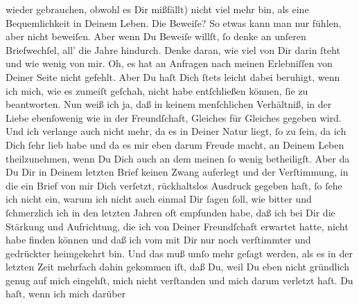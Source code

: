 \begin{ledgroupsized}[t]{13cm}
               wieder gebrauchen,  obwohl es Dir mißfällt) nicht viel mehr bin, als eine Bequemlichkeit in Deinem
               Leben. Die Beweiſe? So etwas kann man nur fühlen, aber nicht beweiſen. Aber wenn Du
               Beweiſe willſt, ſo denke an unſeren Briefwechſel, all’ die Jahre hindurch. Denke {\pb}daran, wie viel von Dir darin ſteht und wie wenig
               von mir. Oh, es hat an Anfragen nach meinen Erlebniſſen von Deiner Seite nicht
               gefehlt. Aber Du haſt Dich ſtets leicht dabei beruhigt, wenn ich mich, wie es zumeiſt
               geſchah, nicht habe entſchließen können, ſie zu beantworten. Nun weiß ich ja, daß in
               keinem menſchlichen Verhältniß, in der Liebe ebenſowenig wie in der Freundſchaft,
               Gleiches für Gleiches gegeben wird. Und ich verlange auch nicht mehr, da es in Deiner
               Natur liegt, ſo zu ſein, da ich Dich ſehr lieb habe und da es mir eben darum Freude
               macht, an Deinem Leben theilzunehmen, wenn Du Dich auch an dem meinen ſo wenig
               betheiligſt. Aber da Du Dir in Deinem letzten Brief keinen Zwang auferlegt und der
               Verſtimmung, in die ein Brief von mir Dich verſetzt, rückhaltslos Ausdruck gegeben
               haſt, ſo ſehe ich nicht ein, warum ich nicht auch einmal Dir ſagen ſoll, wie bitter
               und ſchmerzlich \strikeout{\textcolor{gray}{h}} ich in den letzten Jahren oft  empfunden
               habe, daß {\pb}ich bei Dir die Stärkung und Aufrichtung,
               die ich von Deiner Freundſchaft erwartet hatte, nicht habe finden können und daß ich
               vom \label{K_L03194-2v}\label{K_L03194-2h} mit Dir nur noch verſtimmter und gedrückter heimgekehrt bin. Und das muß umſo
               mehr geſagt werden, als es in der letzten Zeit mehrfach dahin gekommen iſt, daß Du,
               weil Du eben nicht gründlich genug auf mich eingehſt, mich \strikeout{\textcolor{gray}{×}\-\textcolor{gray}{×}} nicht verſtanden und mich darum verletzt haſt. Du haſt, wenn ich mich darüber

\end{ledgroupsized}
